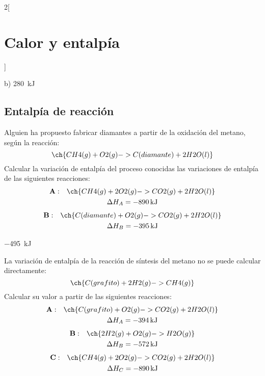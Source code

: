\documentclass[10pt]{article}
\begin{document}
\begin{multicols}{2}[
    \section{Calor y entalpía}
  ]
  \begin{solution}
    b) \SI{280}{\kilo\joule}
  \end{solution}




  \subsection{Entalpía de reacción}

  \begin{exercise}[
      tags    = {termodinámica, entalpía, ley de Hess},
      topics  = {química, termoquímica, termodinámica},
      source  = {},
    ]
    Alguien ha propuesto fabricar diamantes a partir de la oxidación del metano, según la reacción:
    \[ \ch{CH4(g) + O2(g) -> C(diamante) + 2 H2O(l)}  \]
    Calcular la variación de entalpía del proceso conocidas las variaciones de entalpía de las siguientes reacciones:
    \begin{multline*}
      \mathbf{A:}\quad\ch{CH4(g) + 2 O2(g) -> CO2(g) + 2 H2O(l)} \\
        \Delta H_A = \SI{-890}{\kilo\joule}
    \end{multline*}
    \begin{multline*}
      \mathbf{B:}\quad\ch{C(diamante) + O2(g) -> CO2(g) + 2 H2O(l)} \\
        \Delta H_B = \SI{-395}{\kilo\joule}
    \end{multline*}


  \end{exercise}

  \begin{solution}
    \SI{-495}{\kilo\joule}
  \end{solution}




  \begin{exercise}[
      tags    = {termodinámica, entalpía, ley de Hess},
      topics  = {química, termoquímica, termodinámica},
      source  = {},
    ]
    La variación de entalpía de la reacción de síntesis del metano no se puede calcular directamente:
    \[ \ch{C(grafito) + 2 H2(g) -> CH4(g)}  \]
    Calcular su valor a partir de las siguientes reacciones:
    \begin{multline*}
      \mathbf{A:} \quad \ch{C(grafito) + O2(g) -> CO2(g) + 2 H2O(l)} \\
      \Delta H_A = \SI{-394}{\kilo\joule}
    \end{multline*}
    \begin{multline*}
      \mathbf{B:} \quad \ch{2 H2(g) + O2(g)-> H2O(g)} \\
      \Delta H_B = \SI{-572}{\kilo\joule}
    \end{multline*}
    \begin{multline*}
      \mathbf{C:} \quad \ch{CH4(g) + 2 O2(g) -> CO2(g) + 2 H2O(l)} \\
      \Delta H_C = \SI{-890}{\kilo\joule}
    \end{multline*}
  \end{exercise}


\end{multicols}
\end{document}
